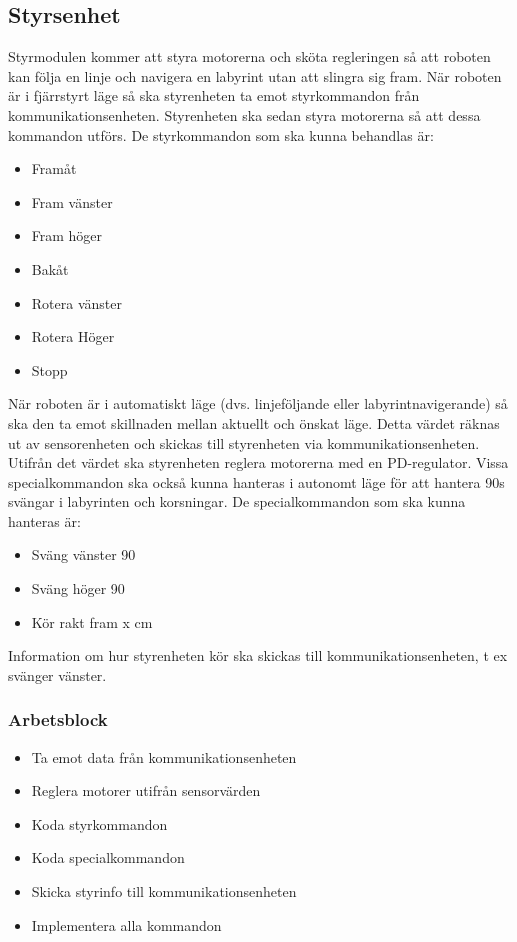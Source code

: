 \documentclass[a4paper,12pt]{article}
\begin{document}
\subsection{Styrsenhet}
Styrmodulen kommer att styra motorerna och sköta regleringen så att roboten kan följa en linje och navigera en labyrint utan att slingra sig fram.
När roboten är i fjärrstyrt läge så ska styrenheten ta emot styrkommandon från kommunikationsenheten.
Styrenheten ska sedan styra motorerna så att dessa kommandon utförs. De styrkommandon som ska kunna behandlas är:
\begin{itemize}
        \item Framåt
        \item Fram vänster
        \item Fram höger
        \item Bakåt
        \item Rotera vänster
        \item Rotera Höger
        \item Stopp
\end{itemize}

När roboten är i automatiskt läge (dvs. linjeföljande eller labyrintnavigerande) så ska den ta emot skillnaden mellan aktuellt och önskat läge.
Detta värdet räknas ut av sensorenheten och skickas till styrenheten via kommunikationsenheten.
Utifrån det värdet ska styrenheten reglera motorerna med en PD-regulator. Vissa specialkommandon ska också kunna hanteras i autonomt läge 
för att hantera 90\degree s svängar i labyrinten och korsningar. De specialkommandon som ska kunna hanteras är:
\begin{itemize}
        \item Sväng vänster 90\degree
        \item Sväng höger 90\degree
        \item Kör rakt fram x cm
\end{itemize}

Information om hur styrenheten kör ska skickas till kommunikationsenheten, t ex svänger vänster.

\subsubsection{Arbetsblock}
\begin{itemize}
        \item Ta emot data från kommunikationsenheten
        \item Reglera motorer utifrån sensorvärden
        \item Koda styrkommandon
        \item Koda specialkommandon
        \item Skicka styrinfo till kommunikationsenheten
        \item Implementera alla kommandon
\end{itemize}
\end{document}
